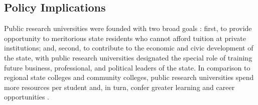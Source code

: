 \documentclass[twoside]{article}
\begin{document}
\subsection*{Policy Implications}


Public research universities were founded with two broad goals \citep{RN2269,RN1149}: first, to provide opportunity to meritorious state residents who cannot afford tuition at private institutions; and, second, to contribute to the economic and civic development of the state, with public research universities designated the special role of training future business, professional, and political leaders of the state.  In comparison to regional state colleges and community colleges, public research universities spend more resources per student and, in turn, confer greater learning and career opportunities \citep{RN1545}. 
\end{document}
